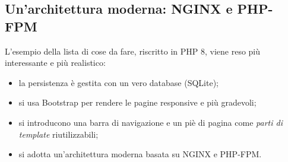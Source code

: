 
\subsection{Un'architettura moderna: NGINX e PHP-FPM}

L'esempio della lista di cose da fare, riscritto in PHP 8, viene reso più
interessante e più realistico:

\begin{itemize}
  \item la persistenza è gestita con un vero database (SQLite);
  \item si usa Bootstrap per rendere le pagine responsive e più gradevoli;
  \item si introducono una barra di navigazione e un piè di pagina come
        \textit{parti di template} riutilizzabili;
  \item si adotta un'architettura moderna basata su NGINX e PHP-FPM.
\end{itemize}

